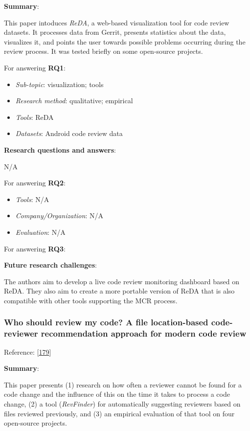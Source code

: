 \documentclass[]{book}
\providecommand{\tightlist}{%
  \setlength{\itemsep}{0pt}\setlength{\parskip}{0pt}}
\begin{document}
\textbf{Summary}:

This paper intoduces \emph{ReDA}, a web-based visualization tool for
code review datasets. It processes data from Gerrit, presents statistics
about the data, visualizes it, and points the user towards possible
problems occurring during the review process. It was tested briefly on
some open-source projects.

For answering \textbf{RQ1}:

\begin{itemize}
\tightlist
\item
  \emph{Sub-topic}: visualization; tools
\item
  \emph{Research method}: qualitative; empirical
\item
  \emph{Tools}: ReDA
\item
  \emph{Datasets}: Android code review data
\end{itemize}

\textbf{Research questions and answers}:

N/A

For answering \textbf{RQ2}:

\begin{itemize}
\tightlist
\item
  \emph{Tools}: N/A
\item
  \emph{Company/Organization}: N/A
\item
  \emph{Evaluation}: N/A
\end{itemize}

For answering \textbf{RQ3}:

\textbf{Future research challenges}:

The authors aim to develop a live code review monitoring dashboard based
on ReDA. They also aim to create a more portable version of ReDA that is
also compatible with other tools supporting the MCR process.

\subsubsection{Who should review my code? A file location-based
code-reviewer recommendation approach for modern code
review}\label{who-should-review-my-code-a-file-location-based-code-reviewer-recommendation-approach-for-modern-code-review}

Reference: {[}\protect\hyperlink{ref-thongtanunam2015should}{179}{]}

\textbf{Summary}:

This paper presents (1) research on how often a reviewer cannot be found
for a code change and the influence of this on the time it takes to
process a code change, (2) a tool (\emph{RevFinder}) for automatically
suggesting reviewers based on files reviewed previously, and (3) an
empirical evaluation of that tool on four open-source projects.
\end{document}
